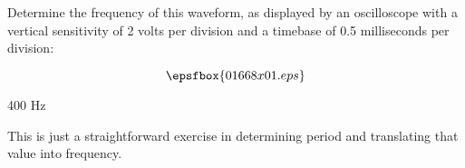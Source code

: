 

Determine the frequency of this waveform, as displayed by an oscilloscope with a vertical sensitivity of 2 volts per division and a timebase of 0.5 milliseconds per division:

$$\epsfbox{01668x01.eps}$$







400 Hz







This is just a straightforward exercise in determining period and translating that value into frequency.




